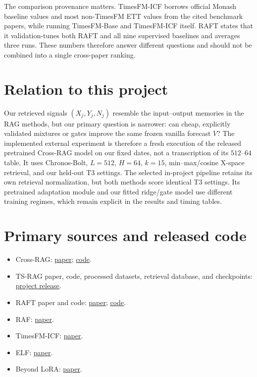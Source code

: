 \documentclass[10pt]{article}
\begin{document}
The comparison provenance matters. TimesFM-ICF borrows official Monash
baseline values and most non-TimesFM ETT values from the cited benchmark
papers, while running TimesFM-Base and TimesFM-ICF itself. RAFT states that it
validation-tunes both RAFT and all nine supervised baselines and averages three
runs. These numbers therefore answer different questions and should not be
combined into a single cross-paper ranking.

\section{Relation to this project}
Our retrieved signals $(X_j,Y_j,N_j)$ resemble the input--output memories in
the RAG methods, but our primary question is narrower: can cheap, explicitly
validated mixtures or gates improve the same frozen vanilla forecast $V$?
The implemented external experiment is therefore a fresh execution of the
released pretrained Cross-RAG model on our fixed \Tthree dates, not a
transcription of its $512$--$64$ table. It uses Chronos-Bolt, $L=512$, $H=64$,
$k=15$, min--max/cosine X-space retrieval, and our held-out T3 settings.
The selected in-project pipeline retains its own retrieval normalization, but
both methods score identical T3 settings. Its pretrained adaptation module and
our fitted ridge/gate model use different training regimes, which remain
explicit in the results and timing tables.

\section{Primary sources and released code}
\begin{itemize}
\item Cross-RAG:
\href{https://arxiv.org/abs/2603.14709}{paper};
\href{https://github.com/seunghan96/Cross-RAG}{code}.
\item TS-RAG paper, code, processed datasets, retrieval database, and
checkpoints:
\href{https://github.com/UConn-DSIS/TS-RAG}{project release}.
\item RAFT paper and code:
\href{https://proceedings.mlr.press/v267/han25d.html}{paper};
\href{https://github.com/archon159/RAFT}{code}.
\item RAF: \href{https://arxiv.org/abs/2411.08249}{paper}.
\item TimesFM-ICF:
\href{https://proceedings.mlr.press/v267/faw25b.html}{paper}.
\item ELF: \href{https://proceedings.mlr.press/v267/lee25ag.html}{paper}.
\item Beyond LoRA: \href{https://arxiv.org/abs/2409.11302}{paper}.
\end{itemize}
\end{document}
